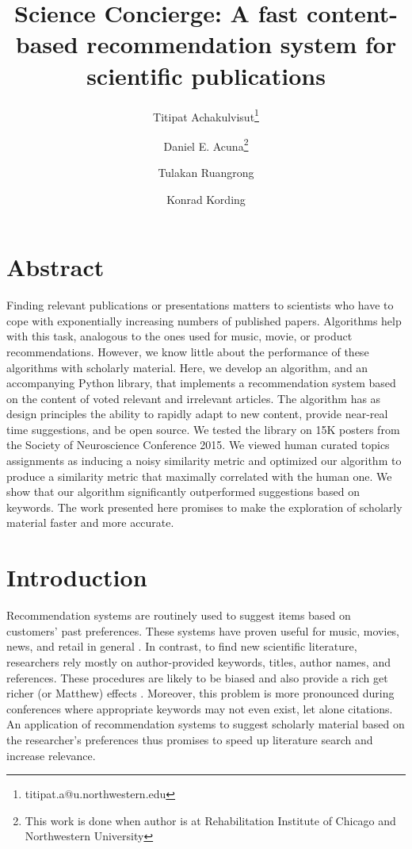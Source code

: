 \documentclass[a4paper]{article}
\title{Science Concierge: A fast content-based recommendation system for scientific publications}
\author[1]{Titipat Achakulvisut\thanks{titipat.a@u.northwestern.edu}}
\author[3]{Daniel E. Acuna\thanks{This work is done when author is at Rehabilitation Institute of Chicago and Northwestern University}}
\author[4]{Tulakan Ruangrong}
\author[1,2]{Konrad Kording}
\affil[1]{Northwestern University}
\affil[2]{Rehabilitation Institute of Chicago}
\affil[3]{Syracuse University}
\affil[4]{Mahidol University}
\begin{document}
\maketitle

\section{Abstract}

Finding relevant publications or presentations matters to scientists who have to cope with exponentially increasing numbers of published papers. Algorithms help with this task, analogous to the ones used for music, movie, or product recommendations. However, we know little about the performance of these algorithms with scholarly material. Here, we develop an algorithm, and an accompanying Python library, that implements a recommendation system based on the content of voted relevant and irrelevant articles. The algorithm has as design principles the ability to rapidly adapt to new content, provide near-real time suggestions, and be open source. We tested the library on 15K posters from the Society of Neuroscience Conference 2015. We viewed human curated topics assignments as inducing a noisy similarity metric and optimized our algorithm to produce a similarity metric that maximally correlated with the human one. We show that our algorithm significantly outperformed suggestions based on keywords.  The work presented here promises to make the exploration of scholarly material faster and more accurate.

\section{Introduction}

Recommendation systems are routinely used to suggest items based on customers’ past preferences. These systems have proven useful for music, movies, news, and retail in general \cite{manning2008introduction}. In contrast, to find new scientific literature, researchers rely mostly on author-provided keywords, titles, author names, and references. These procedures are likely to be biased \cite{chavalarias2010science} and also provide a rich get richer (or Matthew) effects \cite{petersen2011quantitative}. Moreover, this problem is more pronounced during conferences where appropriate keywords may not even exist, let alone citations. An application of recommendation systems to suggest scholarly material based on the researcher’s preferences thus promises to speed up literature search and increase relevance.
\end{document}
